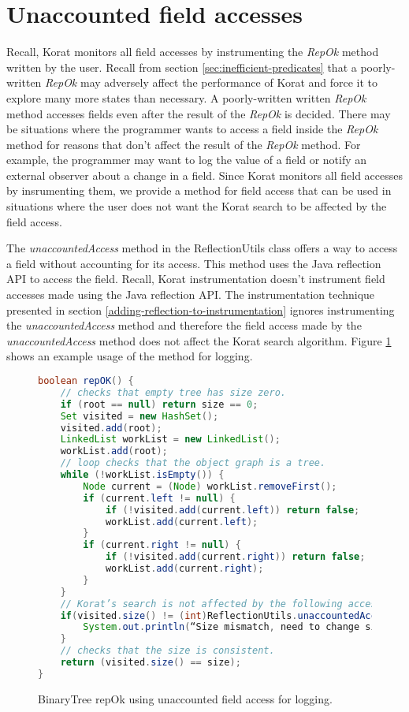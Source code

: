 \section{Unaccounted field accesses}
\label{ch:unaccounted-field-accesses}
Recall, Korat monitors all field accesses by instrumenting the
\emph{RepOk} method written by the user. Recall from section
\ref{sec:inefficient-predicates} that a poorly-written \emph{RepOk}
may adversely affect the performance of Korat and force it to explore
many more states than necessary. A poorly-written written \emph{RepOk}
method accesses fields even after the result of the \emph{RepOk} is
decided. There may be situations where the programmer wants to access
a field inside the \emph{RepOk} method for reasons that don't affect
the result of the \emph{RepOk} method. For example, the programmer may
want to log the value of a field or notify an external observer about
a change in a field. Since Korat monitors all field accesses by
insrumenting them, we provide a method for field access that can be
used in situations where the user does not want the Korat search to be
affected by the field access.

\para The \emph{unaccountedAccess} method in the ReflectionUtils class
offers a way to access a field without accounting for its access. This
method uses the Java reflection API to access the field. Recall, Korat
instrumentation doesn't instrument field accesses made using the Java
reflection API. The instrumentation technique presented in section
\ref{adding-reflection-to-instrumentation} ignores instrumenting the
\emph{unaccountedAccess} method and therefore the field access made by
the \emph{unaccountedAccess} method does not affect the Korat search
algorithm. Figure \ref{fig:bTreeUnaccountedFieldAccess} shows an
example usage of the method for logging. 

\begin{figure}
\centering
\begin{lstlisting}[language=Java]
boolean repOK() {
    // checks that empty tree has size zero.
    if (root == null) return size == 0;
    Set visited = new HashSet();
    visited.add(root);
    LinkedList workList = new LinkedList();
    workList.add(root);
    // loop checks that the object graph is a tree.
    while (!workList.isEmpty()) {
        Node current = (Node) workList.removeFirst();
        if (current.left != null) {
            if (!visited.add(current.left)) return false;
            workList.add(current.left);
        }
        if (current.right != null) {
            if (!visited.add(current.right)) return false;
            workList.add(current.right);
        }
    }
    // Korat’s search is not affected by the following access.
    if(visited.size() != (int)ReflectionUtils.unaccountedAccess(this,”size”)){
        System.out.println(“Size mismatch, need to change size”);
    }
    // checks that the size is consistent.
    return (visited.size() == size);
}
\end{lstlisting}
\caption{BinaryTree repOk using unaccounted field access for logging.}
\label{fig:bTreeUnaccountedFieldAccess}
\end{figure}
